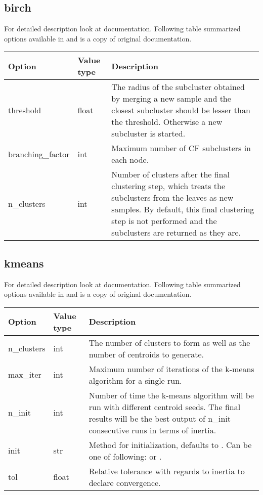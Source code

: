 \documentclass[a4paper,10pt,english]{sphinxmanual}
\begin{document}
\subsection{birch}
\label{valve/valve_config:birch}
For detailed description look at \href{http://scikit-learn.org/stable/modules/generated/sklearn.cluster.Birch.html\#sklearn.cluster.Birch}{} documentation. Following table summarized options available in  and is a copy of original documentation.

\noindent\begin{tabulary}{\linewidth}{|L|L|L|}
\hline
\textsf{\relax 
Option
\unskip}\relax &\textsf{\relax 
Value type
\unskip}\relax &\textsf{\relax 
Description
\unskip}\relax \\
\hline
threshold
&
float
&
The radius of the subcluster obtained by merging a new sample
and the closest subcluster should be lesser than the threshold.
Otherwise a new subcluster is started.
\\
\hline
branching\_factor
&
int
&
Maximum number of CF subclusters in each node.
\\
\hline
n\_clusters
&
int
&
Number of clusters after the final clustering step, which
treats the subclusters from the leaves as new samples. By
default, this final clustering step is not performed and the
subclusters are returned as they are.
\\
\hline\end{tabulary}



\subsection{kmeans}
\label{valve/valve_config:kmeans}
For detailed description look at \href{http://scikit-learn.org/stable/modules/generated/sklearn.cluster.KMeans.html\#sklearn.cluster.KMeans}{} documentation. Following table summarized options available in  and is a copy of original documentation.

\noindent\begin{tabulary}{\linewidth}{|L|L|L|}
\hline
\textsf{\relax 
Option
\unskip}\relax &\textsf{\relax 
Value type
\unskip}\relax &\textsf{\relax 
Description
\unskip}\relax \\
\hline
n\_clusters
&
int
&
The number of clusters to form as well as the number of
centroids to generate.
\\
\hline
max\_iter
&
int
&
Maximum number of iterations of the k-means algorithm for a
single run.
\\
\hline
n\_init
&
int
&
Number of time the k-means algorithm will be run with different
centroid seeds. The final results will be the best output of
n\_init consecutive runs in terms of inertia.
\\
\hline
init
&
str
&
Method for initialization, defaults to . Can be
one of following:  or .
\\
\hline
tol
&
float
&
Relative tolerance with regards to inertia to declare
convergence.
\\
\hline\end{tabulary}
\end{document}
